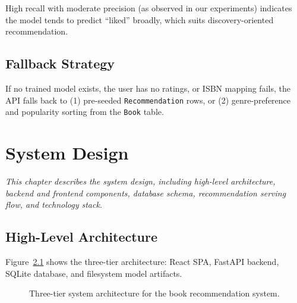 \documentclass[12pt,a4paper]{report}
\newcommand{\chapterdesc}[1]{%
    \vspace{-0.6\baselineskip}
    \noindent\hspace*{1.5cm}\parbox{\dimexpr\textwidth-1.5cm\relax}{\textit{#1}}
    \par\vspace{0.3\baselineskip}
}
\begin{document}
High recall with moderate precision (as observed in our experiments) indicates the model tends to predict ``liked'' broadly, which suits discovery-oriented recommendation.

\section{Fallback Strategy}

If no trained model exists, the user has no ratings, or ISBN mapping fails, the API falls back to (1) pre-seeded \texttt{Recommendation} rows, or (2) genre-preference and popularity sorting from the \texttt{Book} table.

\chapter{System Design}
\chapterdesc{This chapter describes the system design, including high-level architecture, backend and frontend components, database schema, recommendation serving flow, and technology stack.}

\section{High-Level Architecture}

Figure~\ref{fig:architecture} shows the three-tier architecture: React SPA, FastAPI backend, SQLite database, and filesystem model artifacts.

\begin{figure}[htbp]
\centering
{}
\caption{Three-tier system architecture for the book recommendation system.}
\label{fig:architecture}
\end{figure}
\end{document}
